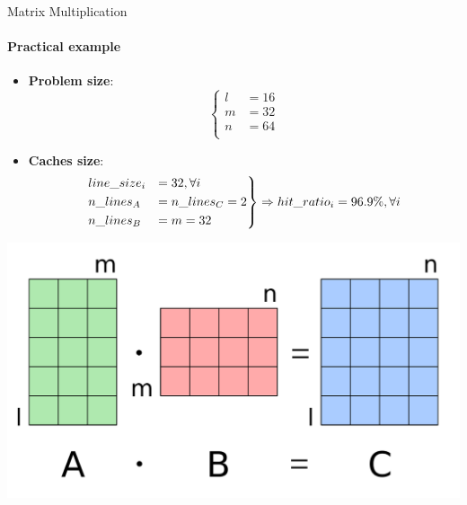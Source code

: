 \documentclass[handout]{beamer}
\begin{document}
\begin{frame}{Matrix Multiplication}
	\framesubtitle{Practical example}
	\begin{minipage}{.75\textwidth}
		\begin{itemize}
			\item \textbf{Problem size}:\\
				\[\begin{cases}
					l &= 16 \\
					m &= 32 \\
					n &= 64 \\
				\end{cases}\]
			\item \textbf{Caches size}:\\
				\[\begin{rcases}
					line\_size_i &=  32, \forall i \\
					n\_lines_A &= n\_lines_C = 2 \\
					n\_lines_B &= m = 32\\
				\end{rcases}
				\Rightarrow
				hit\_ratio_i = 96.9\%, \forall i\]
		\end{itemize}
	\end{minipage}
	\begin{minipage}{.23\textwidth}
		\begin{center}
			\includegraphics[width=.9\textwidth]{matmul.png}
		\end{center}
	\end{minipage}
\end{frame}
\end{document}

